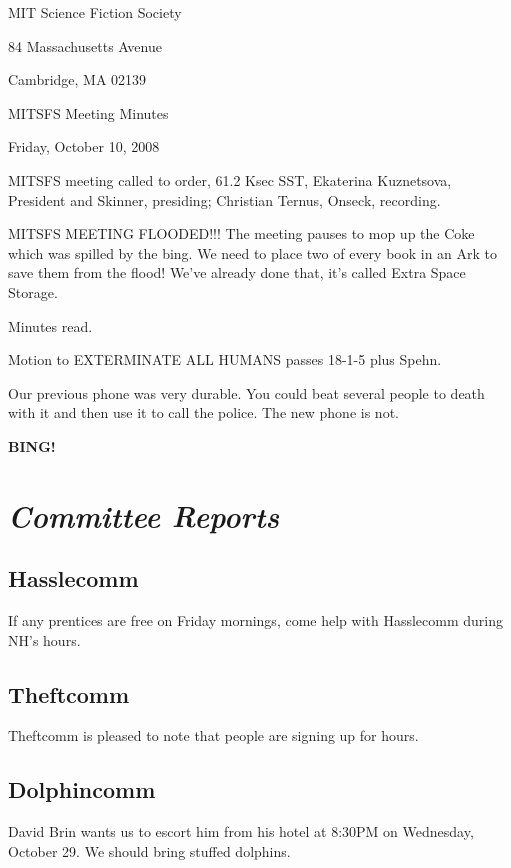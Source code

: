 \documentclass[10pt]{article}
\newcommand{\bing}{{\bf BING!} }
\newcommand{\goto}[1]{\bing \vskip 12pt \section*{{\em{#1}}}}
\newcommand{\ps}{ plus Spehn\xspace}
\begin{document}
\begin{center}

MIT Science Fiction Society

84 Massachusetts Avenue

Cambridge, MA 02139

\vspace{12pt}

MITSFS Meeting Minutes

Friday, October 10, 2008

\end{center}

\vspace{18pt}

\setlength{\parskip}{6pt}

\noindent
MITSFS meeting called to order, 61.2 Ksec SST,
Ekaterina Kuznetsova, President and Skinner, presiding; Christian Ternus, Onseck, recording.

MITSFS MEETING FLOODED!!!  The meeting pauses to mop up the Coke which
was spilled by the bing.  We need to place two of every book in an Ark
to save them from the flood!  We've already done that, it's called
Extra Space Storage.

Minutes read.

Motion to EXTERMINATE ALL HUMANS passes 18-1-5 \ps.

Our previous phone was very durable.  You could beat several people to
death with it and then use it to call the police.  The new phone is not.

\goto{Committee Reports}

\subsection*{Hasslecomm}

If any prentices are free on Friday mornings, come help with Hasslecomm during NH's hours.

\subsection*{Theftcomm}

Theftcomm is pleased to note that people are signing up for hours.

\subsection*{Dolphincomm}

David Brin wants us to escort him from his hotel at 8:30PM on
Wednesday, October 29.  We should bring stuffed dolphins.
\end{document}
